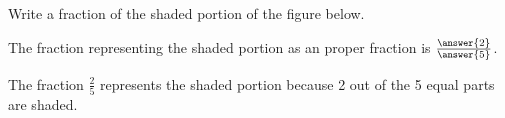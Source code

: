 \documentclass{ximera}
\begin{document}
\begin{problem}
 
Write a fraction of the shaded portion of the figure below.
 
\begin{center}
\end{center}
 
The fraction representing the shaded portion as an proper fraction is $\frac{\answer{2}}{\answer{5}}$.

\begin{feedback}
The fraction $\frac{2}{5}$ represents the shaded portion because 2 out of the 5 equal parts are shaded.
\end{feedback}

\end{problem}
 
\end{document}
